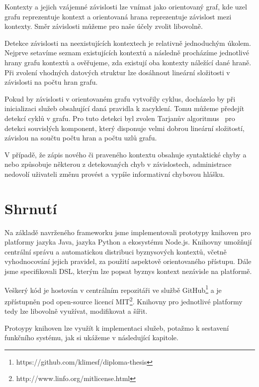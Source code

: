 Kontexty a jejich vzájemné závislosti lze vnímat jako
orientovaný graf, kde uzel grafu reprezentuje kontext
a orientovaná hrana reprezentuje závislost mezi kontexty.
Směr závislosti můžeme pro naše účely zvolit libovolně.

Detekce závislosti na neexistujících kontextech je relativně
jednoduchým úkolem. Nejprve setavíme seznam existujících kontextů
a následně procházíme jednotlivé hrany grafu kontextů a ověřujeme,
zda existují oba kontexty náležící dané hraně.
Při zvolení vhodných datových struktur lze dosáhnout
lineární složitosti v závislosti na počtu hran grafu.

Pokud by závislosti v orientovaném grafu vytvořily cyklus,
docházelo by při inicializaci služeb
obsahující daná pravidla k zacyklení. Tomu můžeme předejít
detekcí cyklů v grafu. Pro tuto detekci byl zvolen
Tarjanův algoritmus~\cite{tarjan1971depth} pro detekci souvislých
komponent, který disponuje velmi dobrou lineární složitostí,
závislou na součtu počtu hran a počtu uzlů grafu.

V případě, že zápis nového či praveného kontextu obsahuje syntaktické
chyby a nebo způsobuje některou z detekovaných chyb v závislostech,
administrace nedovolí uživateli změnu provést a vypíše informativní
chybovou hlášku.

\section{Shrnutí}

Na základě navrženého frameworku jsme implementovali prototypy
knihoven pro platformy jazyka Java, jazyka Python a ekosystému
Node.js. Knihovny umožňují centrální správu a automatickou distribuci
byznysových kontextů, včetně vyhodnocování jejich pravidel, za
použití aspektově orientovaného přístupu.
Dále jsme specifikovali DSL, kterým lze popsat byznys kontext
nezávisle na platformě.

Veškerý kód je hostován v centrálním repozitáři
ve službě GitHub\footnote{
https://github.com/klimesf/diploma-thesis
} a je zpřístupněn pod open-source licencí MIT\footnote{
http://www.linfo.org/mitlicense.html
}. Knihovny pro jednotlivé platformy tedy lze libovolně
využívat, modifikovat a šířit.

Protoypy knihoven lze využít k implementaci služeb,
potažmo k sestavení funkčního systému, jak si ukážeme
v následující kapitole.
